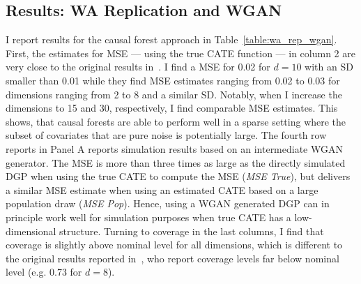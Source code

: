 \documentclass[11pt, a4paper, leqno]{article}
\begin{document}
\subsection{Results: WA Replication and WGAN}
I report results for the causal forest approach in Table~\ref*{table:wa_rep_wgan}.
First, the estimates for MSE --- using the true CATE function --- in column 2 are very close to the original results in~\cite{wager2018estimation}.
I find a MSE for 0.02 for $d=10$ with an SD smaller than 0.01 while they find MSE estimates ranging from 0.02 to 0.03 for dimensions ranging from 2 to 8 and a similar SD\@.
Notably, when I increase the dimensions to 15 and 30, respectively, I find comparable MSE estimates.
This shows, that causal forests are able to perform well in a sparse setting where the subset of covariates that are pure noise is potentially large.
The fourth row reports in Panel A reports simulation results based on an intermediate WGAN generator.
The MSE is more than three times as large as the directly simulated DGP when using the true CATE to compute the MSE (\textit{MSE True}), but delivers a similar MSE estimate when using an estimated CATE based on a large population draw (\textit{MSE Pop}).
Hence, using a WGAN generated DGP can in principle work well for simulation purposes when true CATE has a low-dimensional structure.
Turning to coverage in the last columns, I find that coverage is slightly above nominal level for all dimensions, which is different to the original results reported in~\cite{wager2018estimation}, who report coverage levels far below nominal level (e.g. 0.73 for $d=8$).
\end{document}
